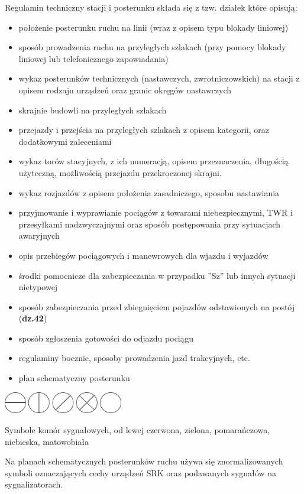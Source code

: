 Regulamin techniczny stacji i posterunku składa się z tzw. działek które opisują:
\begin{itemize}
	\item położenie posterunku ruchu na linii (wraz z opisem typu blokady liniowej)
	\item sposób prowadzenia ruchu na przyległych szlakach (przy pomocy blokady liniowej lub telefonicznego zapowiadania)
	\item wykaz posterunków technicznych (nastawczych, zwrotniczowskich) na stacji z opisem rodzaju urządzeń oraz granic okręgów nastawczych
	\item skrajnie budowli na przyległych szlakach
	\item przejazdy i przejścia na przyległych szlakach z opisem kategorii, oraz dodatkowymi zaleceniami
	\item wykaz torów stacyjnych, z ich numeracją, opisem przeznaczenia, długością użyteczną, możliwością przejazdu przekroczonej skrajni.
	\item wykaz rozjazdów z opisem położenia zasadniczego, sposobu nastawiania
	\item przyjmowanie i wyprawianie pociągów z towarami niebezpiecznymi, TWR i przesyłkami nadzwyczajnymi oraz sposób postępowania przy sytuacjach awaryjnych
	\item opis przebiegów pociągowych i manewrowych dla wjazdu i wyjazdów
	\item środki pomocnicze dla zabezpieczania w przypadku ''Sz'' lub innych sytuacji nietypowej
	\item sposób zabezpieczania przed zbiegnięciem pojazdów odstawionych na postój (\textbf{dz.42})
	\item sposób zgłoszenia gotowości do odjazdu pociągu
	\item regulaminy bocznic, sposoby prowadzenia jazd trakcyjnych, etc.
	\item plan schematyczny posterunku
\end{itemize}
	\begin{marginfigure}
	\includegraphics[width=5.2cm]{skryptkierownik-img/komory_sygnalowe_pl.png}
	\caption{Symbole komór sygnałowych, od lewej czerwona, zielona, pomarańczowa, niebieska, matowobiała}
\end{marginfigure}

Na planach schematycznych posterunków ruchu używa się znormalizowanych symboli oznaczających cechy urządzeń SRK oraz podawanych sygnałów na sygnalizatorach.

